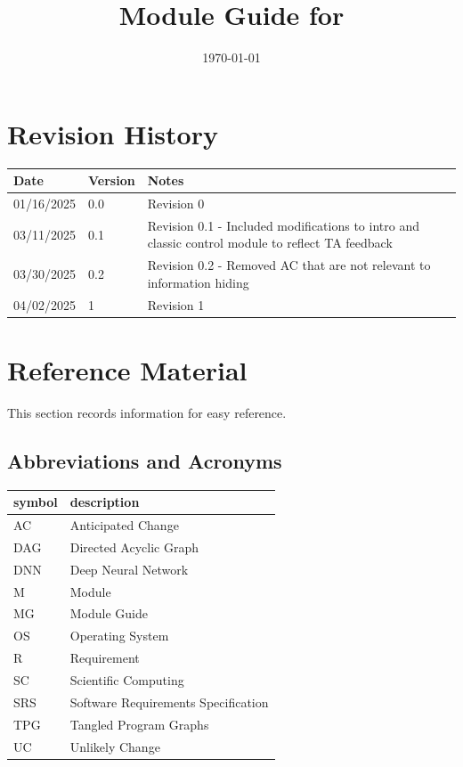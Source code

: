 \documentclass[12pt, titlepage]{article}
\begin{document}
\title{Module Guide for \progname{}} 
\author{\authname}
\date{\today}

\maketitle


\section{Revision History}

\begin{tabularx}{\textwidth}{p{3cm}p{2cm}X}
\toprule {\bf Date} & {\bf Version} & {\bf Notes}\\
\midrule
01/16/2025 & 0.0 & Revision 0\\
03/11/2025 & 0.1 & Revision 0.1 - Included  modifications to intro and classic control module to reflect TA feedback\\
03/30/2025 & 0.2 & Revision 0.2 - Removed AC that are not relevant to information hiding\\
04/02/2025 & 1 & Revision 1\\
\bottomrule
\end{tabularx}

\newpage

\section{Reference Material}

This section records information for easy reference.

\subsection{Abbreviations and Acronyms}

\renewcommand{\arraystretch}{1.2}
\begin{tabular}{l l} 
  \toprule		
  \textbf{symbol} & \textbf{description}\\
  \midrule 
  AC & Anticipated Change\\
  DAG & Directed Acyclic Graph \\
  DNN & Deep Neural Network \\
  M & Module \\
  MG & Module Guide \\
  OS & Operating System \\
  R & Requirement\\
  SC & Scientific Computing \\
  SRS & Software Requirements Specification\\
  TPG & Tangled Program Graphs\\
  UC & Unlikely Change \\
  \bottomrule
\end{tabular}\\
\end{document}
